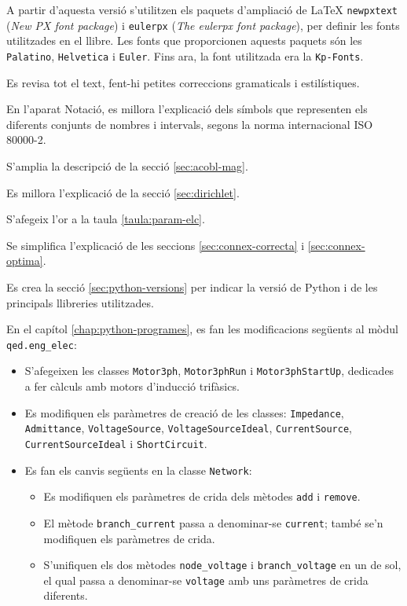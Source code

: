 A partir d'aquesta versió s'utilitzen els paquets d'ampliació de \LaTeX{}
\texttt{newpxtext} (\textit{New PX font package}) i \texttt{eulerpx} (\textit{The eulerpx font package}), per definir les fonts utilitzades en el llibre. Les fonts que proporcionen aquests paquets són les \texttt{Palatino}, \texttt{Helvetica} i \AmS{} \texttt{Euler}.
Fins ara, la font utilitzada era la \texttt{Kp-Fonts}.

Es revisa tot el text, fent-hi petites correccions gramaticals i estilístiques.

En l'aparat Notació, es millora l'explicació dels símbols que representen els diferents conjunts de nombres i intervals, segons la norma internacional ISO 80000-2.

S'amplia la descripció de la secció \ref{sec:acobl-mag}.

Es millora l'explicació de la secció \ref{sec:dirichlet}.

S'afegeix l'or a la taula \ref{taula:param-elc}.

Se simplifica l'explicació de les seccions \ref{sec:connex-correcta} i \ref{sec:connex-optima}.

Es crea la secció \ref{sec:python-versions} per indicar la versió de Python i de les principals llibreries utilitzades. 


En el capítol \ref{chap:python-programes}, es fan les modificacions següents al mòdul  \texttt{qed.eng\_elec}:
\begin{itemize}
	\item S'afegeixen les classes  \texttt{Motor3ph}, \texttt{Motor3phRun} i 
	\texttt{Motor3phStartUp}, dedicades a fer càlculs amb motors d'inducció trifàsics.
	\item Es modifiquen els paràmetres de creació de les classes: \texttt{Impedance}, \texttt{Admittance}, \texttt{VoltageSource}, \texttt{VoltageSourceIdeal}, \texttt{CurrentSource}, \texttt{CurrentSourceIdeal} i \texttt{ShortCircuit}.
	\item Es fan els canvis següents en la classe \texttt{Network}:
	\begin{itemize}
		\item Es modifiquen els paràmetres de crida dels mètodes \texttt{add} i \texttt{remove}.
		\item  El mètode \texttt{branch\_current} passa a denominar-se \texttt{current}; també se'n modifiquen els paràmetres de crida.
		\item S'unifiquen els dos mètodes \texttt{node\_voltage} i \texttt{branch\_voltage} en un de sol, el qual passa a denominar-se \texttt{voltage} amb uns paràmetres de crida diferents. 
	\end{itemize}
\end{itemize}

